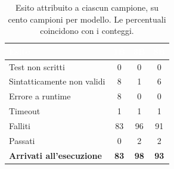 \begin{table}[H]
\centering
\caption{Esito attribuito a ciascun campione, su cento campioni per modello.
Le percentuali coincidono con i conteggi.}
\label{tab:esiti}
\begin{tabular}{lccc}
\hline
\rowcolor{intest}
\textcolor{white}{\textbf{Esito}} & \textcolor{white}{\textbf{1B}} &
\textcolor{white}{\textbf{3B}} & \textcolor{white}{\textbf{8B}} \\
\hline
Test non scritti            &  0 &  0 &  0 \\
Sintatticamente non validi  &  8 &  1 &  6 \\
Errore a runtime            &  8 &  0 &  0 \\
Timeout                     &  1 &  1 &  1 \\
Falliti                     & 83 & 96 & 91 \\
Passati                     &  0 &  2 &  2 \\
\hline
\rowcolor{accento}
\textbf{Arrivati all'esecuzione} & \textbf{83} & \textbf{98} & \textbf{93} \\
\hline
\end{tabular}
\end{table}

